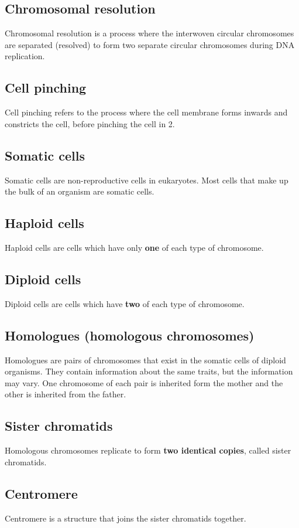 \documentclass[11pt]{article}
\begin{document}
\subsection{Chromosomal resolution}
\label{sec:org0820768}
Chromosomal resolution is a process where the interwoven circular chromosomes are separated (resolved) to form two separate circular chromosomes during DNA replication.
\subsection{Cell pinching}
\label{sec:orge4fc944}
Cell pinching refers to the process where the cell membrane forms inwards and constricts the cell, before pinching the cell in 2.
\subsection{Somatic cells}
\label{sec:org8ef2c5b}
Somatic cells are non-reproductive cells in eukaryotes. Most cells that make up the bulk of an organism are somatic cells.
\subsection{Haploid cells}
\label{sec:org24ed525}
Haploid cells are cells which have only \textbf{one} of each type of chromosome.
\subsection{Diploid cells}
\label{sec:org9020972}
Diploid cells are cells which have \textbf{two} of each type of chromosome.
\subsection{Homologues (homologous chromosomes)}
\label{sec:org9bd2683}
Homologues are pairs of chromosomes that exist in the somatic cells of diploid organisms. They contain information about the same traits, but the information may vary. One chromosome of each pair is inherited form the mother and the other is inherited from the father.
\subsection{Sister chromatids}
\label{sec:org8825e9f}
Homologous chromosomes replicate to form \textbf{two identical copies}, called sister chromatids.
\subsection{Centromere}
\label{sec:org5c2ed96}
Centromere is a structure that joins the sister chromatids together.
\end{document}
